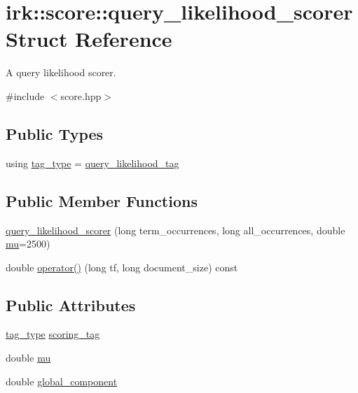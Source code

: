 \hypertarget{structirk_1_1score_1_1query__likelihood__scorer}{}\section{irk\+:\+:score\+:\+:query\+\_\+likelihood\+\_\+scorer Struct Reference}
\label{structirk_1_1score_1_1query__likelihood__scorer}


A query likelihood scorer.  




{\ttfamily \#include $<$score.\+hpp$>$}

\subsection*{Public Types}
\begin{DoxyCompactItemize}
\item 
using \mbox{\hyperlink{structirk_1_1score_1_1query__likelihood__scorer_a4a7795fbd9f018d25bdc59c5ae001e2a}{tag\+\_\+type}} = \mbox{\hyperlink{structirk_1_1score_1_1query__likelihood__tag}{query\+\_\+likelihood\+\_\+tag}}
\end{DoxyCompactItemize}
\subsection*{Public Member Functions}
\begin{DoxyCompactItemize}
\item 
\mbox{\hyperlink{structirk_1_1score_1_1query__likelihood__scorer_a2dec2ccfc8fd86799470a53a007ee898}{query\+\_\+likelihood\+\_\+scorer}} (long term\+\_\+occurrences, long all\+\_\+occurrences, double \mbox{\hyperlink{structirk_1_1score_1_1query__likelihood__scorer_a9322ba7c56a58a417ac72b33e93e7300}{mu}}=2500)
\item 
double \mbox{\hyperlink{structirk_1_1score_1_1query__likelihood__scorer_a3f5b6ba010468b0a0eccbbca849a9393}{operator()}} (long tf, long document\+\_\+size) const
\end{DoxyCompactItemize}
\subsection*{Public Attributes}
\begin{DoxyCompactItemize}
\item 
\mbox{\hyperlink{structirk_1_1score_1_1query__likelihood__scorer_a4a7795fbd9f018d25bdc59c5ae001e2a}{tag\+\_\+type}} \mbox{\hyperlink{structirk_1_1score_1_1query__likelihood__scorer_ab0248969eb132cf91b9b6103d7d2568e}{scoring\+\_\+tag}}
\item 
double \mbox{\hyperlink{structirk_1_1score_1_1query__likelihood__scorer_a9322ba7c56a58a417ac72b33e93e7300}{mu}}
\item 
double \mbox{\hyperlink{structirk_1_1score_1_1query__likelihood__scorer_ab32a8a554078c02c337eeb6fc585be2f}{global\+\_\+component}}
\end{DoxyCompactItemize}


